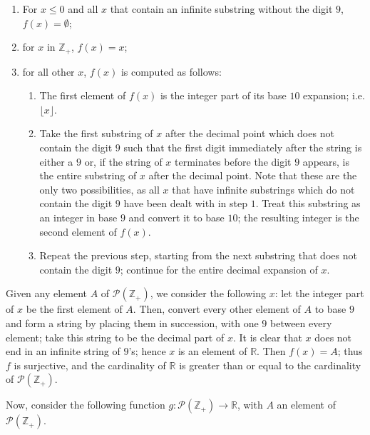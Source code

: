 \documentclass[12 pt]{article}
\begin{document}
\renewcommand{\labelitemi}{\Roman{enumi}.}
\renewcommand{\labelitemii}{\roman{enumii}.}
\begin{enumerate}
	\item For $x\leq0$ and all $x$ that contain an infinite substring without the digit $9$, $f(x)=\emptyset$;
	\item for $x$ in $\mathbb{Z}_+$, $f(x)=x$;
	\item for all other $x$, $f(x)$ is computed as follows:
		\begin{enumerate}
			\item The first element of $f(x)$ is the integer part of its base $10$ expansion; i.e. $\lfloor x\rfloor$.
			\item Take the first substring of $x$ after the decimal point which does not contain the digit $9$ such that the first digit immediately after the string is either a $9$ or, if the string of $x$ terminates before the digit $9$ appears, is the entire substring of $x$ after the decimal point. Note that these are the only two possibilities, as all $x$ that have infinite substrings which do not contain the digit $9$ have been dealt with in step $1$.  Treat this substring as an integer in base $9$ and convert it to base $10$; the resulting integer is the second element of $f(x)$.
			\item Repeat the previous step, starting from the next substring that does not contain the digit $9$; continue for the entire decimal expansion of $x$.
		\end{enumerate}
\end{enumerate}

Given any element $A$ of $\mathcal{P}(\mathbb{Z}_+)$, we consider the following $x$: let the integer part of $x$ be the first element of $A$.  Then, convert every other element of $A$ to base $9$ and form a string by placing them in succession, with one $9$ between every element; take this string to be the decimal part of $x$.  It is clear that $x$ does not end in an infinite string of $9$'s; hence $x$ is an element of $\mathbb{R}$.  Then $f(x)=A$; thus $f$ is surjective, and the cardinality of $\mathbb{R}$ is greater than or equal to the cardinality of $\mathcal{P}(\mathbb{Z_+})$.

\bigskip

Now, consider the following function $g:\mathcal{P}(\mathbb{Z_+})\to\mathbb{R}$, with $A$ an element of $\mathcal{P}(\mathbb{Z_+})$.
\end{document}
